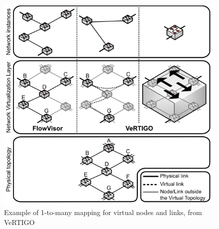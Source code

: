 \begin{figure}[ht]
\centering
\includegraphics[scale=0.8]{figures/onetomany.png}
\caption{Example of 1-to-many mapping for virtual nodes and links, from VeRTIGO~\cite{VeRTIGO-Corin2012a}}
\label{fig:1tomany}
\end{figure}
